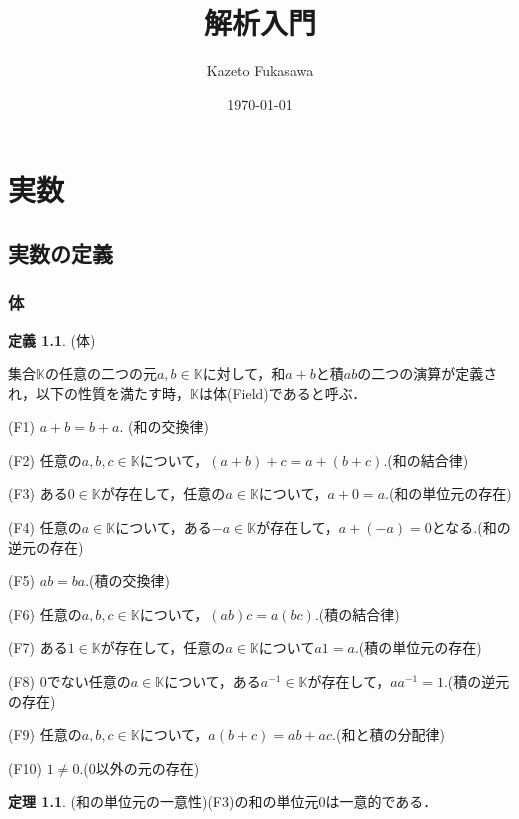 \documentclass[oneside,openany]{jbook}
\title{解析入門}
\author{Kazeto Fukasawa}
\date{\today}
\theoremstyle{definition}
\newtheorem{theorem}{定理}
\newtheorem{definition}{定義}
\begin{document}
\maketitle
\tableofcontents


\chapter{実数}
\section{実数の定義}
\subsection{体}

\begin{definition}{(体)}

集合$\mathbb{K}$の任意の二つの元$a, b \in \mathbb{K}$に対して，和$a+b$と積$ab$の二つの演算が定義され，以下の性質を満たす時，$\mathbb{K}$は体(Field)であると呼ぶ．


\begin{description}
\item{(F1)} $a + b = b + a$. (和の交換律)
\item{(F2)} 任意の$a, b, c \in \mathbb{K}$について，$(a+b)+c = a+(b+c)$.(和の結合律)
\item{(F3)} ある$0 \in \mathbb{K}$が存在して，任意の$a \in \mathbb{K}$について，$a+0=a$.(和の単位元の存在)
\item{(F4)} 任意の$a \in \mathbb{K}$について，ある$-a \in \mathbb{K}$が存在して，$a + (-a)=0$となる.(和の逆元の存在)
\item{(F5)} $ab = ba$.(積の交換律)
\item{(F6)} 任意の$a,b,c \in \mathbb{K}$について，$(ab)c=a(bc)$.(積の結合律)
\item{(F7)} ある$1 \in \mathbb{K}$が存在して，任意の$a \in \mathbb{K}$について$a1 = a$.(積の単位元の存在)
\item{(F8)} $0$でない任意の$a \in \mathbb{K}$について，ある$a^{-1} \in \mathbb{K}$が存在して，$aa^{-1}=1$.(積の逆元の存在)
\item{(F9)} 任意の$a,b,c \in \mathbb{K}$について，$a(b+c)=ab+ac$.(和と積の分配律)
\item{(F10)} $1 \neq 0$.($0$以外の元の存在)
\end{description}

\end{definition}

\begin{theorem}{(和の単位元の一意性)}\label{theorem:sum_identity_elem_unique}
(F3)の和の単位元$0$は一意的である．
\end{theorem}
\end{document}
